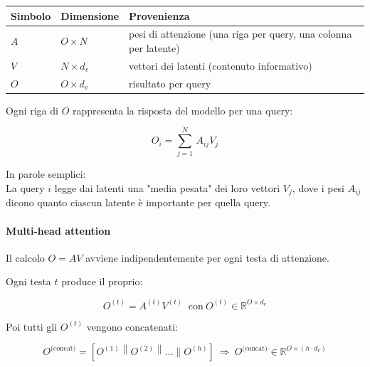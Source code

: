 \documentclass[
  11pt,
]{article}
\newcounter{none} %
\begin{document}
{\def\LTcaptype{none} %
\begin{longtable}{@{}
  >{\raggedright\arraybackslash}p{}
  >{\raggedright\arraybackslash}p{}
  >{\raggedright\arraybackslash}p{}@{}}
\toprule\noalign{}
\begin{minipage}[b]{\linewidth}\raggedright
Simbolo
\end{minipage} & \begin{minipage}[b]{\linewidth}\raggedright
Dimensione
\end{minipage} & \begin{minipage}[b]{\linewidth}\raggedright
Provenienza
\end{minipage} \\
\midrule\noalign{}
\endhead
\bottomrule\noalign{}
\endlastfoot
\(A\) & \(O \times N\) & pesi di attenzione (una riga per query, una
colonna per latente) \\
\(V\) & \(N \times d_{v}\) & vettori dei latenti (contenuto
informativo) \\
\(O\) & \(O \times d_{v}\) & risultato per query \\
\end{longtable}
}

Ogni riga di \(O\) rappresenta la risposta del modello per una query:

\[O_{i} = \sum_{j = 1}^{N}\, A_{ij}V_{j}\]

In parole semplici:\\
La query \(i\) legge dai latenti una "media pesata" dei loro vettori
\(V_{j}\), dove i pesi \(A_{ij}\) dicono quanto ciascun latente è
importante per quella query.

\paragraph{Multi-head attention}

Il calcolo \(O = AV\) avviene indipendentemente per ogni testa di
attenzione.

Ogni testa \(t\) produce il proprio:

\[O^{(t)} = A^{(t)}V^{(t)}\ \text{ con}\ O^{(t)} \in \mathbb{R}^{O \times d_{v}}\]

Poi tutti gli \(O^{(t)}\) vengono concatenati:

\[O^{\text{(concat)}} = \left\lbrack O^{(1)}\left\| O^{(2)} \right\|\ldots\| O^{(h)} \right\rbrack\  \Rightarrow \ O^{\text{(concat)}} \in \mathbb{R}^{O \times \left( h \cdot d_{v} \right)}\]
\end{document}
